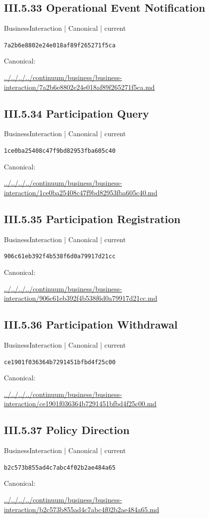\documentclass[10pt,a4paper]{article}
\begin{document}
\subsection*{III.5.33 Operational Event Notification}
{\small BusinessInteraction | Canonical | current}\par
\texttt{7a2b6e8802e24e018af89f265271f5ca}\par
Canonical: \par
{\footnotesize\url{../../../../continuum/business/business-interaction/7a2b6e8802e24e018af89f265271f5ca.md}}\par
\subsection*{III.5.34 Participation Query}
{\small BusinessInteraction | Canonical | current}\par
\texttt{1ce0ba25408c47f9bd82953fba605c40}\par
Canonical: \par
{\footnotesize\url{../../../../continuum/business/business-interaction/1ce0ba25408c47f9bd82953fba605c40.md}}\par
\subsection*{III.5.35 Participation Registration}
{\small BusinessInteraction | Canonical | current}\par
\texttt{906c61eb392f4b538f6d0a79917d21cc}\par
Canonical: \par
{\footnotesize\url{../../../../continuum/business/business-interaction/906c61eb392f4b538f6d0a79917d21cc.md}}\par
\subsection*{III.5.36 Participation Withdrawal}
{\small BusinessInteraction | Canonical | current}\par
\texttt{ce1901f036364b7291451bfbd4f25c00}\par
Canonical: \par
{\footnotesize\url{../../../../continuum/business/business-interaction/ce1901f036364b7291451bfbd4f25c00.md}}\par
\subsection*{III.5.37 Policy Direction}
{\small BusinessInteraction | Canonical | current}\par
\texttt{b2c573b855ad4c7abc4f02b2ae484a65}\par
Canonical: \par
{\footnotesize\url{../../../../continuum/business/business-interaction/b2c573b855ad4c7abc4f02b2ae484a65.md}}\par
\end{document}
